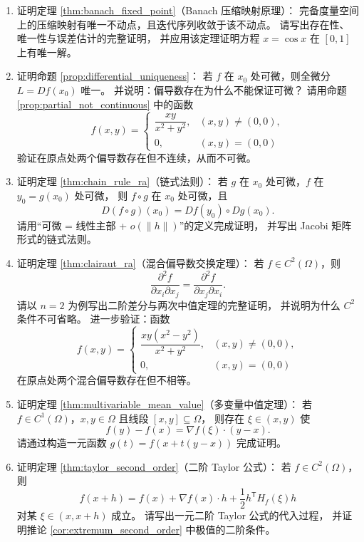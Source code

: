 \begin{enumerate}[leftmargin=3em, label=\textbf{题 \arabic*}]
    \item 证明定理 \ref{thm:banach_fixed_point}（Banach 压缩映射原理）：
    完备度量空间上的压缩映射有唯一不动点，且迭代序列收敛于该不动点。
    请写出存在性、唯一性与误差估计的完整证明，
    并应用该定理证明方程 $x=\cos x$ 在 $[0,1]$ 上有唯一解。

    \item 证明命题 \ref{prop:differential_uniqueness}：
    若 $f$ 在 $x_0$ 处可微，则全微分 $L=Df(x_0)$ 唯一。
    并说明：偏导数存在为什么不能保证可微？
    请用命题 \ref{prop:partial_not_continuous} 中的函数
    \[
    f(x,y)=\begin{cases}
    \dfrac{xy}{x^2+y^2}, & (x,y)\neq(0,0),\\
    0, & (x,y)=(0,0)
    \end{cases}
    \]
    验证在原点处两个偏导数存在但不连续，从而不可微。

    \item 证明定理 \ref{thm:chain_rule_ra}（链式法则）：
    若 $g$ 在 $x_0$ 处可微，$f$ 在 $y_0=g(x_0)$ 处可微，
    则 $f\circ g$ 在 $x_0$ 处可微，且
    \[
    D(f\circ g)(x_0)=Df(y_0)\circ Dg(x_0).
    \]
    请用“可微 = 线性主部 + $o(\|h\|)$”的定义完成证明，
    并写出 Jacobi 矩阵形式的链式法则。

    \item 证明定理 \ref{thm:clairaut_ra}（混合偏导数交换定理）：
    若 $f\in C^2(\Omega)$，则
    \[
    \frac{\partial^2 f}{\partial x_i\partial x_j}
    =
    \frac{\partial^2 f}{\partial x_j\partial x_i}.
    \]
    请以 $n=2$ 为例写出二阶差分与两次中值定理的完整证明，
    并说明为什么 $C^2$ 条件不可省略。
    进一步验证：函数
    \[
    f(x,y)=\begin{cases}
    \dfrac{xy(x^2-y^2)}{x^2+y^2}, & (x,y)\neq(0,0),\\
    0, & (x,y)=(0,0)
    \end{cases}
    \]
    在原点处两个混合偏导数存在但不相等。

    \item 证明定理 \ref{thm:multivariable_mean_value}（多变量中值定理）：
    若 $f\in C^1(\Omega)$，$x,y\in\Omega$ 且线段 $[x,y]\subseteq\Omega$，
    则存在 $\xi\in(x,y)$ 使
    \[
    f(y)-f(x)=\nabla f(\xi)\cdot(y-x).
    \]
    请通过构造一元函数 $g(t)=f(x+t(y-x))$ 完成证明。

    \item 证明定理 \ref{thm:taylor_second_order}（二阶 Taylor 公式）：
    若 $f\in C^2(\Omega)$，则
    \[
    f(x+h)=f(x)+\nabla f(x)\cdot h
    +\frac12 h^{\mathsf T}H_f(\xi)h
    \]
    对某 $\xi\in(x,x+h)$ 成立。
    请写出一元二阶 Taylor 公式的代入过程，
    并证明推论 \ref{cor:extremum_second_order} 中极值的二阶条件。


\end{enumerate}
